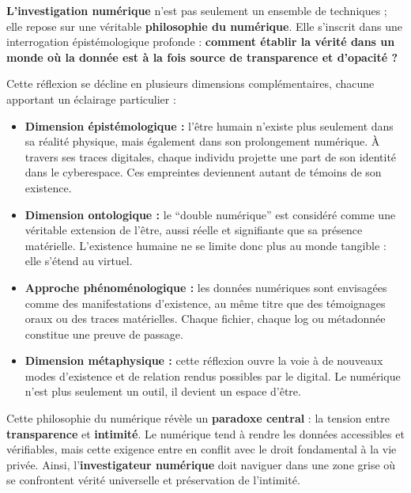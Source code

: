\documentclass[12pt,a4paper]{report}
\begin{document}
	{\Large
		
		\noindent
		\textbf{  L’investigation numérique} n’est pas seulement un ensemble de techniques ;  
		elle repose sur une véritable \textbf{philosophie du numérique}.  
		Elle s’inscrit dans une interrogation épistémologique profonde :  
		\textbf{comment établir la vérité dans un monde où la donnée est à la fois source de transparence et d’opacité ?}  
		
		\bigskip
		Cette réflexion se décline en plusieurs dimensions complémentaires, chacune apportant un éclairage particulier :  
		
		\begin{itemize}
			\item \textbf{Dimension épistémologique :} l’être humain n’existe plus seulement dans sa réalité physique, mais également dans son prolongement numérique.  
			À travers ses traces digitales, chaque individu projette une part de son identité dans le cyberespace.  
			Ces empreintes deviennent autant de témoins de son existence.  
			
			\item \textbf{Dimension ontologique :} le “double numérique” est considéré comme une véritable extension de l’être, aussi réelle et signifiante que sa présence matérielle.  
			L’existence humaine ne se limite donc plus au monde tangible : elle s’étend au virtuel.  
			
			\item \textbf{Approche phénoménologique :} les données numériques sont envisagées comme des manifestations d’existence, au même titre que des témoignages oraux ou des traces matérielles.  
			Chaque fichier, chaque log ou métadonnée constitue une preuve de passage.  
			
			\item \textbf{Dimension métaphysique :} cette réflexion ouvre la voie à de nouveaux modes d’existence et de relation rendus possibles par le digital.  
			Le numérique n’est plus seulement un outil, il devient un espace d’être.  
		\end{itemize}
		
		\bigskip
		Cette philosophie du numérique révèle un \textbf{paradoxe central} :  
		la tension entre \textbf{transparence} et \textbf{intimité}.  
		Le numérique tend à rendre les données accessibles et vérifiables, mais cette exigence entre en conflit avec le droit fondamental à la vie privée.  
		Ainsi, l’\textbf{investigateur numérique} doit naviguer dans une zone grise où se confrontent vérité universelle et préservation de l’intimité.  
		
}
\end{document}

